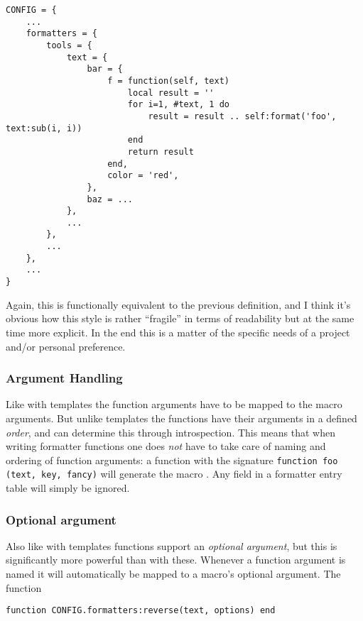\documentclass{scrartcl}
\begin{document}
\begin{verbatim}
CONFIG = {
    ...
    formatters = {
        tools = {
            text = {
                bar = {
                    f = function(self, text)
                        local result = ''
                        for i=1, #text, 1 do
                            result = result .. self:format('foo', text:sub(i, i))
                        end
                        return result
                    end,
                    color = 'red',
                },
                baz = ...
            },
            ...
        },
        ...
    },
    ...
}
\end{verbatim}

\noindent Again, this is functionally equivalent to the previous definition, and
I think it's obvious how this style is rather “fragile” in terms of readability
but at the same time more explicit.  In the end this is a matter of the specific
needs of a project and/or personal preference.


\subsubsection{Argument Handling}
\label{sec:functions-argument-handling}

Like with templates the function arguments have to be mapped to the macro
arguments. But unlike templates the functions have their arguments in a defined
\emph{order}, and  can determine this through
introspection.  This means that when writing formatter functions one does
\emph{not} have to take care of naming and ordering of function arguments: a
function with the signature \texttt{function foo (text, key, fancy)}
will generate the macro \texttt{}.  Any
 field in a formatter entry table will simply be ignored.


\subsubsection{Optional argument}
\label{sec:functions-optional-argument}

Also like with templates functions support an \emph{optional argument}, but this
is significantly more powerful than with these.  Whenever a function argument is
named  it will automatically be mapped to a macro's optional
argument.  The function

\begin{verbatim}
function CONFIG.formatters:reverse(text, options) end
\end{verbatim}
\end{document}
